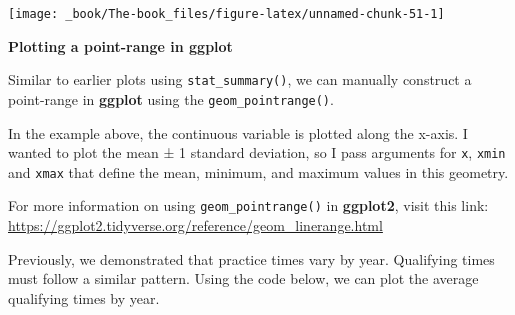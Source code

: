 \documentclass[
]{book}
\begin{document}
\begin{center}\texttt{[image: \_book/The-book\_files/figure-latex/unnamed-chunk-51-1]} \end{center}

\begin{blackbox}

\begin{center}
\textbf{Plotting a point-range in ggplot}

\end{center}

Similar to earlier plots using \texttt{stat\_summary()}, we can manually construct a point-range in \textbf{ggplot} using the \texttt{geom\_pointrange()}.

In the example above, the continuous variable is plotted along the x-axis. I wanted to plot the mean ± 1 standard deviation, so I pass arguments for \texttt{x}, \texttt{xmin} and \texttt{xmax} that define the mean, minimum, and maximum values in this geometry.

For more information on using \texttt{geom\_pointrange()} in \textbf{ggplot2}, visit this link: \url{https://ggplot2.tidyverse.org/reference/geom_linerange.html}

\end{blackbox}

Previously, we demonstrated that practice times vary by year. Qualifying times must follow a similar pattern. Using the code below, we can plot the average qualifying times by year.
\end{document}
